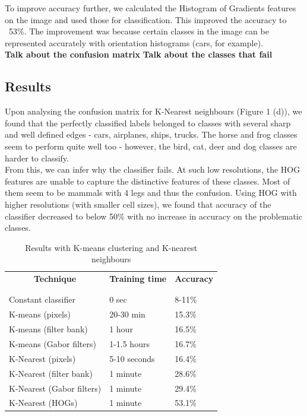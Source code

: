 \documentclass{article} %
\begin{document}
        To improve accuracy further, we calculated the Histogram of Gradients features on the image and used those for classification. This improved the accuracy to ~53\%. The improvement was because certain classes in the image can be represented accurately with orientation histograms (cars, for example).\\

        \textbf{Talk about the confusion matrix}
        \textbf{Talk about the classes that fail}

    \subsection{Results} %
        Upon analysing the confusion matrix for K-Nearest neighbours (Figure 1 (d)), we found that the perfectly classified labels belonged to classes with several sharp and well defined edges - cars, airplanes, ships, trucks. The horse and frog classes seem to perform quite well too - however, the bird, cat, deer and dog classes are harder to classify.\\

        From this, we can infer why the classifier fails. At such low resolutions, the HOG features are unable to capture the distinctive features of these classes. Most of them seem to be mammals with 4 legs and thus the confusion. Using HOG with higher resolutions (with smaller cell sizes), we found that accuracy of the classifier decreased to below 50\% with no increase in accuracy on the problematic classes.\\
        \begin{table}[t]
            \caption{Results with K-means clustering and K-nearest neighbours}
            \begin{center}
                \begin{tabular}{lll}
                    \multicolumn{1}{c}{\bf Technique} &\multicolumn{1}{c}{\bf Training time} &\multicolumn{1}{c}{\bf Accuracy}\\
                    \\ \hline \\
                    Constant classifier & 0 sec & 8-11\%\\
                    K-means (pixels) & 20-30 min & 15.3\% \\
                    K-means (filter bank) & 1 hour& 16.5\% \\
                    K-means (Gabor filters) &1-1.5 hours & 16.7\% \\
                    K-Nearest (pixels) & 5-10 seconds & 16.4\% \\
                    K-Nearest (filter bank) &1 minute& 28.6\% \\
                    K-Nearest (Gabor filters) &1 minute& 29.4\% \\
                    K-Nearest (HOGs) &1 minute& 53.1\% \\
                \end{tabular}
            \end{center}
        \end{table}
\end{document}
